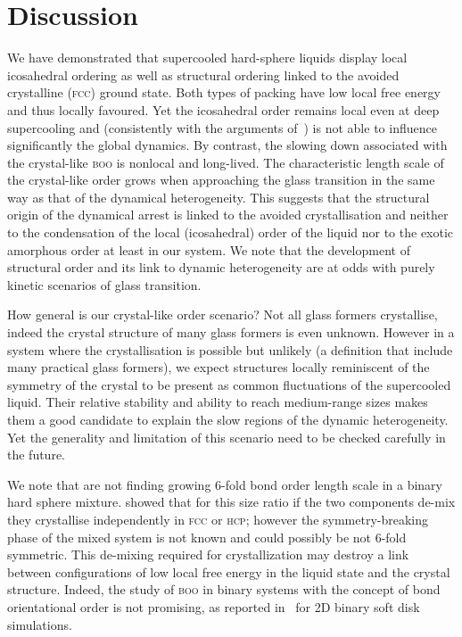 \section*{Discussion}
We have demonstrated that supercooled hard-sphere liquids display local icosahedral ordering as well as structural ordering linked to the avoided crystalline (\textsc{fcc}) ground state. Both types of packing have low local free energy and thus locally favoured. Yet the icosahedral order remains local even at deep supercooling and (consistently with the arguments of~\citep{Berthier2007}) is not able to influence significantly the global dynamics. By contrast, the slowing down associated with the crystal-like \textsc{boo} is nonlocal and long-lived. The characteristic length scale of the crystal-like order grows when approaching the glass transition in the same way as that of the dynamical heterogeneity. This suggests that the structural origin of the dynamical arrest is linked to the avoided crystallisation and neither to the condensation of the local (icosahedral) order of the liquid nor to the exotic amorphous order at least in our system. We note that the development of structural order and its link to dynamic heterogeneity are at odds with purely kinetic scenarios of glass transition.

How general is our crystal-like order scenario? Not all glass formers crystallise, indeed the crystal structure of many glass formers is even unknown. However in a system where the crystallisation is possible but unlikely (a definition that include many practical glass formers), we expect structures locally reminiscent of the symmetry of the crystal to be present as common fluctuations of the supercooled liquid. Their relative stability and ability to reach medium-range sizes makes them a good candidate to explain the slow regions of the dynamic heterogeneity. Yet the generality and limitation of this scenario need to be checked carefully in the future.

We note that \citet{Charbonneau} are not finding growing 6-fold bond order length scale in a binary hard sphere mixture. \citet{Hopkins2011b,Hopkins2012} showed that for this size ratio if the two components de-mix they crystallise independently in \textsc{fcc} or \textsc{hcp}; however the symmetry-breaking phase of the mixed system is not known and could possibly be not 6-fold symmetric. This de-mixing required for crystallization may destroy a link between configurations of low local free energy in the liquid state and the crystal structure. Indeed, the study of \textsc{boo} in binary systems with the concept of bond orientational order is not promising, as reported in~\citep{tanaka2010critical, KawasakiJPCM} for 2D binary soft disk simulations.


